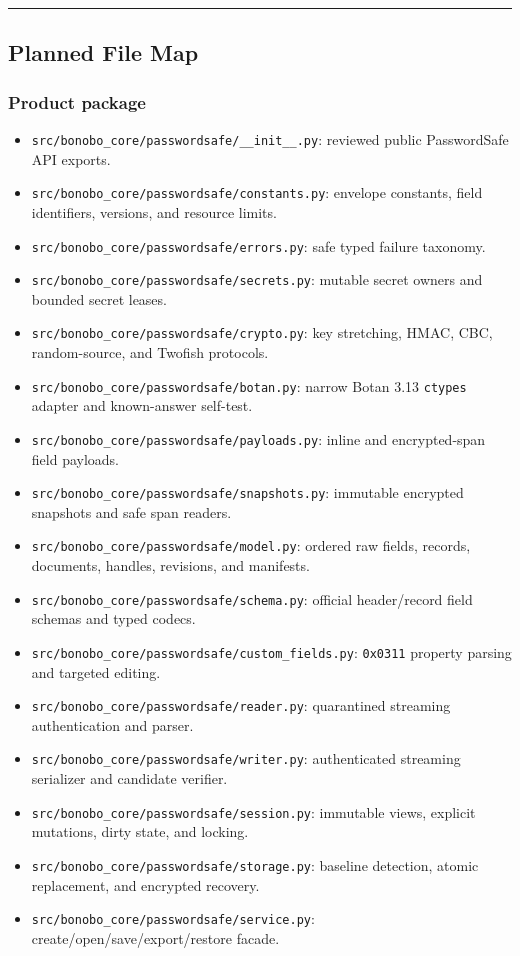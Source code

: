 \documentclass[
  letterpaper,
]{article}
\newcommand{\passthrough}[1]{#1}
\providecommand{\tightlist}{%
  \setlength{\itemsep}{0pt}\setlength{\parskip}{0pt}}
\begin{document}
\begin{center}\rule{0.5\linewidth}{0.5pt}\end{center}

\subsection{Planned File Map}\label{planned-file-map}

\subsubsection{Product package}\label{product-package}

\begin{itemize}
\tightlist
\item
  \nolinkurl{src/bonobo_core/passwordsafe/__init__.py}: reviewed public PasswordSafe API exports.
\item
  \nolinkurl{src/bonobo_core/passwordsafe/constants.py}: envelope constants, field identifiers, versions, and resource
  limits.
\item
  \nolinkurl{src/bonobo_core/passwordsafe/errors.py}: safe typed failure taxonomy.
\item
  \nolinkurl{src/bonobo_core/passwordsafe/secrets.py}: mutable secret owners and bounded secret leases.
\item
  \nolinkurl{src/bonobo_core/passwordsafe/crypto.py}: key stretching, HMAC, CBC, random-source, and Twofish protocols.
\item
  \nolinkurl{src/bonobo_core/passwordsafe/botan.py}: narrow Botan 3.13 \passthrough{\lstinline!ctypes!} adapter and
  known-answer self-test.
\item
  \nolinkurl{src/bonobo_core/passwordsafe/payloads.py}: inline and encrypted-span field payloads.
\item
  \nolinkurl{src/bonobo_core/passwordsafe/snapshots.py}: immutable encrypted snapshots and safe span readers.
\item
  \nolinkurl{src/bonobo_core/passwordsafe/model.py}: ordered raw fields, records, documents, handles, revisions, and
  manifests.
\item
  \nolinkurl{src/bonobo_core/passwordsafe/schema.py}: official header/record field schemas and typed codecs.
\item
  \nolinkurl{src/bonobo_core/passwordsafe/custom_fields.py}: \passthrough{\lstinline!0x0311!} property parsing and
  targeted editing.
\item
  \nolinkurl{src/bonobo_core/passwordsafe/reader.py}: quarantined streaming authentication and parser.
\item
  \nolinkurl{src/bonobo_core/passwordsafe/writer.py}: authenticated streaming serializer and candidate verifier.
\item
  \nolinkurl{src/bonobo_core/passwordsafe/session.py}: immutable views, explicit mutations, dirty state, and locking.
\item
  \nolinkurl{src/bonobo_core/passwordsafe/storage.py}: baseline detection, atomic replacement, and encrypted recovery.
\item
  \nolinkurl{src/bonobo_core/passwordsafe/service.py}: create/open/save/export/restore facade.
\end{itemize}
\end{document}
